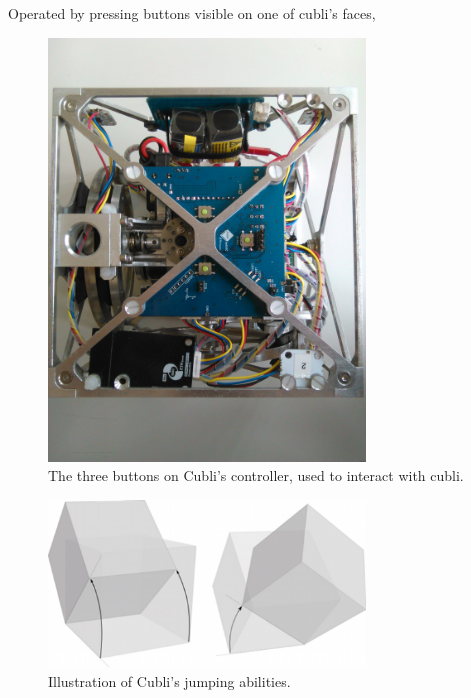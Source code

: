 Operated by pressing buttons visible on one of cubli's faces,
\begin{figure}[ht]
   \centering
   \includegraphics[width=0.75\textwidth]{img/Buttons.jpg}
   \caption{The three buttons on Cubli's controller, used to interact with cubli.}
   \label{img:Jumps}
\end{figure}
\begin{figure}[ht]
   \centering
   \includegraphics[width=0.75\textwidth]{img/Jumps.png}
   \caption{Illustration of Cubli's jumping abilities.}
   \label{img:Jumps}
\end{figure}